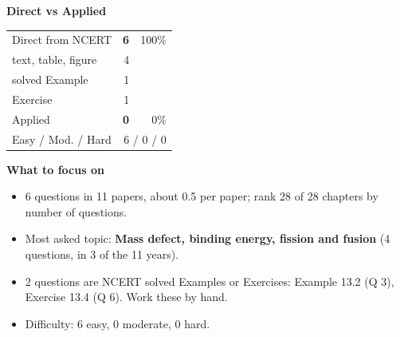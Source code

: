 \begin{minipage}[t]{0.34\linewidth}{\small\textbf{\color{crimson}Direct vs Applied}\par\smallskip
\begin{tabular}{@{}lrr@{}}\toprule
Direct from NCERT & \textbf{6} & 100\%\\
\quad text, table, figure & 4 &\\
\quad solved Example & 1 &\\
\quad Exercise & 1 &\\
Applied & \textbf{0} & 0\%\\\midrule
Easy / Mod. / Hard & \multicolumn{2}{r}{6 / 0 / 0}\\\bottomrule
\end{tabular}}\end{minipage}\hfill
\begin{minipage}[t]{0.63\linewidth}{\small\textbf{\color{crimson}What to focus on}\par\smallskip
\begin{itemize}[leftmargin=1.1em,itemsep=1pt,topsep=0pt]
\item 6 questions in 11 papers, about 0.5 per paper; rank 28 of 28 chapters by number of questions.
\item Most asked topic: \textbf{Mass defect, binding energy, fission and fusion} (4 questions, in 3 of the 11 years).
\item 2 questions are NCERT solved Examples or Exercises: Example 13.2 (Q 3), Exercise 13.4 (Q 6). Work these by hand.
\item Difficulty: 6 easy, 0 moderate, 0 hard.
\end{itemize}}\end{minipage}\par
{}
